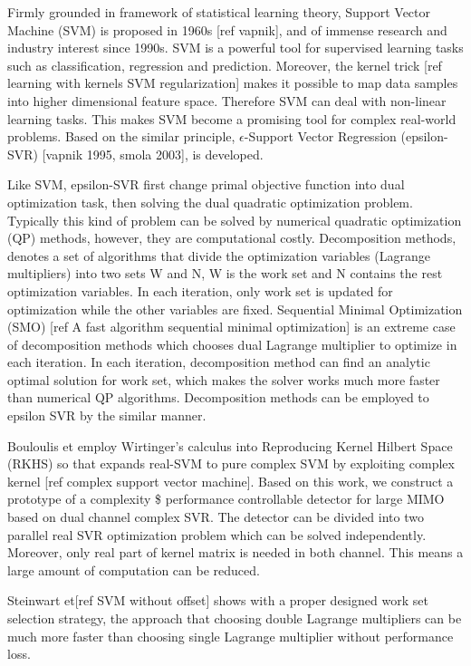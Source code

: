 \documentclass[12pt, draftclsnofoot, onecolumn]{IEEEtran}
\begin{document}
\begin{spacing}{2}
Firmly grounded in framework of statistical learning theory, Support Vector Machine (SVM) is proposed in 1960s [ref vapnik], and of immense research and industry interest since 1990s. SVM is a powerful tool for supervised learning tasks such as classification, regression and prediction. Moreover, the kernel trick [ref learning with kernels SVM regularization] makes it possible to map data samples into higher dimensional feature space. Therefore SVM can deal with non-linear learning tasks. This makes SVM become a promising tool for complex real-world problems.
Based on the similar principle, $\epsilon$-Support Vector Regression (epsilon-SVR) [vapnik 1995, smola 2003], is developed.

Like SVM, epsilon-SVR first change primal objective function into dual optimization task, then solving the dual quadratic optimization problem. Typically this kind of problem can be solved by numerical quadratic optimization (QP) methods, however, they are computational costly. Decomposition methods, denotes a set of algorithms that divide the optimization variables (Lagrange multipliers) into two sets W and N, W is the work set and N contains the rest optimization variables.  In each iteration, only work set is updated for optimization while the other variables are fixed. Sequential Minimal Optimization (SMO) [ref A fast algorithm sequential minimal optimization] is an extreme case of decomposition methods which chooses dual Lagrange multiplier to optimize in each iteration. In each iteration, decomposition method can find an analytic optimal solution for work set, which makes the solver works much more faster than numerical QP algorithms. Decomposition methods can be employed to epsilon SVR by the similar manner.

  Bouloulis et employ Wirtinger’s calculus into Reproducing Kernel Hilbert Space (RKHS) so that expands real-SVM to pure complex SVM by exploiting complex kernel [ref complex support vector machine]. Based on this work, we construct a prototype of a complexity \$ performance controllable detector for large MIMO based on dual channel complex SVR. The detector can be divided into two parallel real SVR optimization problem which can be solved independently. Moreover, only real part of kernel matrix is needed in both channel. This means a large amount of computation can be reduced. 
  
  Steinwart et[ref SVM without offset] shows with a proper designed work set selection strategy, the approach that choosing double Lagrange multipliers can be much more faster than choosing single Lagrange multiplier without performance loss.
  

\end{spacing}
\end{document}
